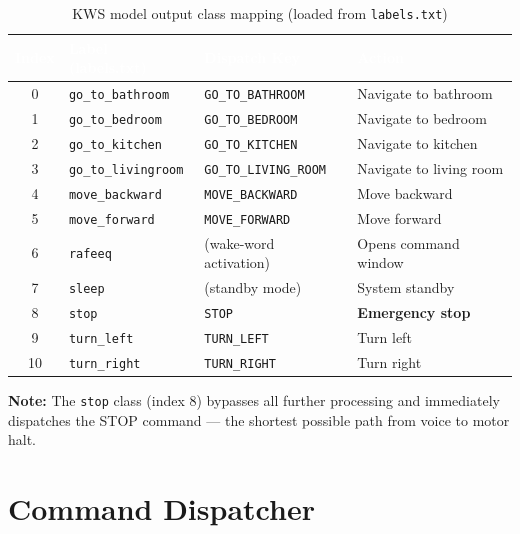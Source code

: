 \documentclass[12pt, a4paper]{report}
\newcommand{\thead}[1]{%
  \cellcolor{tableheader}\textcolor{white}{\textbf{#1}}}
\newcommand{\trow}[1]{\rowcolor{rowalt}#1}
\begin{document}
\begin{table}[h!]
\centering
\caption{KWS model output class mapping (loaded from \texttt{labels.txt})}
\label{tab:labels}
\begin{tabular}{clll}
\toprule
\thead{Index} & \thead{Label (labels.txt)} & \thead{Dispatch Key} & \thead{Action} \\
\midrule
\trow{0}  & \texttt{go\_to\_bathroom}   & \texttt{GO\_TO\_BATHROOM}   & Navigate to bathroom \\
1         & \texttt{go\_to\_bedroom}    & \texttt{GO\_TO\_BEDROOM}    & Navigate to bedroom \\
\trow{2}  & \texttt{go\_to\_kitchen}    & \texttt{GO\_TO\_KITCHEN}    & Navigate to kitchen \\
3         & \texttt{go\_to\_livingroom} & \texttt{GO\_TO\_LIVING\_ROOM} & Navigate to living room \\
\trow{4}  & \texttt{move\_backward}     & \texttt{MOVE\_BACKWARD}     & Move backward \\
5         & \texttt{move\_forward}      & \texttt{MOVE\_FORWARD}      & Move forward \\
\trow{6}  & \texttt{rafeeq}             & (wake-word activation)       & Opens command window \\
7         & \texttt{sleep}              & (standby mode)               & System standby \\
\trow{8}  & \texttt{stop}              & \texttt{STOP}               & \textbf{Emergency stop} \\
9         & \texttt{turn\_left}         & \texttt{TURN\_LEFT}         & Turn left \\
\trow{10} & \texttt{turn\_right}        & \texttt{TURN\_RIGHT}        & Turn right \\
\bottomrule
\end{tabular}
\end{table}

\textbf{Note:} The \texttt{stop} class (index 8) bypasses all further processing and
immediately dispatches the STOP command --- the shortest possible path from voice to
motor halt.

\section{Command Dispatcher}
\end{document}
